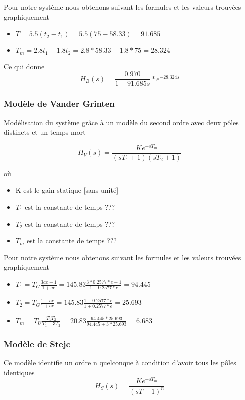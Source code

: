 Pour notre système nous obtenons suivant les formules et les valeurs trouvées graphiquement 
\begin{itemize}
\item $T = 5.5 (t_{2} - t_{1}) = 5.5 (75 - 58.33) = 91.685$
\item $T_{m} = 2.8 t_{1} - 1.8 t_{2} = 2.8*58.33 - 1.8*75 = 28.324$
\end{itemize}

Ce qui donne 
\begin{equation}
H_{B}(s) = \frac{0.970}{1 + 91.685s }*e^{-28.324s}
\end{equation}

\subsubsection{Modèle de Vander Grinten}
Modélisation du système grâce à un modèle du second ordre avec deux pôles distincts et un temps mort

\begin{equation}
H_{V}(s) = \frac{K e^{-s T_{m}}}{(sT_{1} + 1) (sT_{2} + 1)}
\end{equation}

où 
\begin{itemize}
\item K est le gain statique [sans unité]
\item $T_{1}$ est la constante de temps ???
\item $T_{2}$ est la constante de temps ???
\item $T_{m}$ est la constante de temps ???
\end{itemize}

Pour notre système nous obtenons suivant les formules et les valeurs trouvées graphiquement 
\begin{itemize}
\item $T_{1} = T_{G} \frac{3ae - 1}{1 + ae} = 145.83 \frac{3*0.2577*e - 1}{1 + 0.2577*e} = 94.445$
\item $T_{2} = T_{G} \frac{1 - ae}{1 + ae} = 145.83 \frac{1 - 0.2577*e}{1 + 0.2577*e} = 25.693$
\item $T_{m} = T_{U} \frac{T_{1}T_{2}}{T_{1} + 3T_{2}} = 20.83 \frac{94.445*25.693}{94.445 + 3*25.693} = 6.683$
\end{itemize}

\subsubsection{Modèle de Stejc}
Ce modèle identifie un ordre n quelconque à condition d'avoir tous les pôles identiques
\begin{equation}
H_{S}(s) = \frac{K e^{-s T_{m}}}{(sT + 1)^{n}}
\end{equation}

